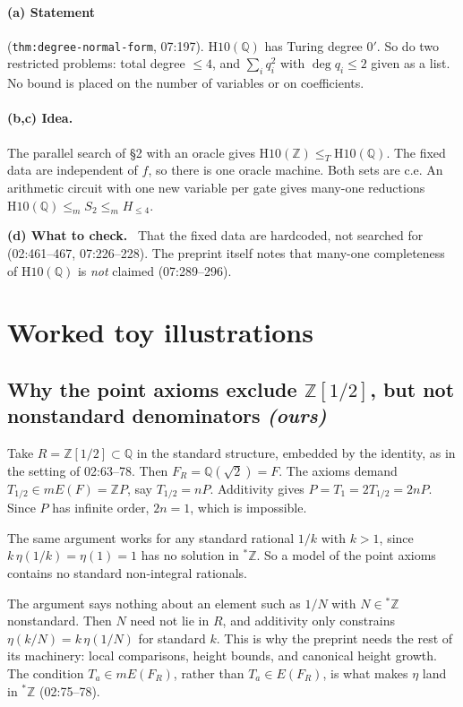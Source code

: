 \documentclass[11pt]{article}
\theoremstyle{definition}
\newcommand{\Q}{\mathbb Q}
\newcommand{\Z}{\mathbb Z}
\newcommand{\sZ}{{}^*\Z}
\newcommand{\lbl}[1]{\texttt{#1}}
\newcommand{\src}[1]{\textsf{#1}}
\newcommand{\checkhead}{\par\smallskip\noindent\textbf{(d) What to check.}\ }
\begin{document}
\paragraph{(a) Statement} (\lbl{thm:degree-normal-form}, \src{07:197}).
$\mathrm{H10}(\Q)$ has Turing degree $0'$.  So do two restricted problems:
total degree $\le4$, and $\sum_i q_i^2$ with $\deg q_i\le2$ given as a
list.  No bound is placed on the number of variables or on coefficients.

\paragraph{(b,c) Idea.}
The parallel search of \S2 with an oracle gives
$\mathrm{H10}(\Z)\le_T\mathrm{H10}(\Q)$.  The fixed data are independent
of $f$, so there is one oracle machine.  Both sets are c.e.  An arithmetic
circuit with one new variable per gate gives many-one reductions
$\mathrm{H10}(\Q)\le_m S_2\le_m H_{\le4}$.

\checkhead
That the fixed data are hardcoded, not searched for (\src{02:461--467},
\src{07:226--228}).  The preprint itself notes that many-one completeness of
$\mathrm{H10}(\Q)$ is \emph{not} claimed (\src{07:289--296}).

\section{Worked toy illustrations}\label{sec:toys}

\subsection{Why the point axioms exclude $\Z[1/2]$, but not nonstandard denominators \emph{(ours)}}
Take $R=\Z[1/2]\subset\Q$ in the standard structure, embedded by the
identity, as in the setting of \src{02:63--78}.  Then
$F_R=\Q(\sqrt2)=F$.  The axioms demand $T_{1/2}\in mE(F)=\Z P$, say
$T_{1/2}=nP$.  Additivity gives $P=T_1=2T_{1/2}=2nP$.  Since $P$ has
infinite order, $2n=1$, which is impossible.

The same argument works for any standard rational $1/k$ with $k>1$, since
$k\,\eta(1/k)=\eta(1)=1$ has no solution in $\sZ$.  So a model of the
point axioms contains no standard non-integral rationals.

The argument says nothing about an element such as $1/N$ with $N\in\sZ$
nonstandard.  Then $N$ need not lie in $R$, and additivity only constrains
$\eta(k/N)=k\,\eta(1/N)$ for standard $k$.  This is why the preprint needs
the rest of its machinery: local comparisons, height bounds, and canonical
height growth.  The condition $T_a\in mE(F_R)$, rather than
$T_a\in E(F_R)$, is what makes $\eta$ land in $\sZ$ (\src{02:75--78}).
\end{document}
